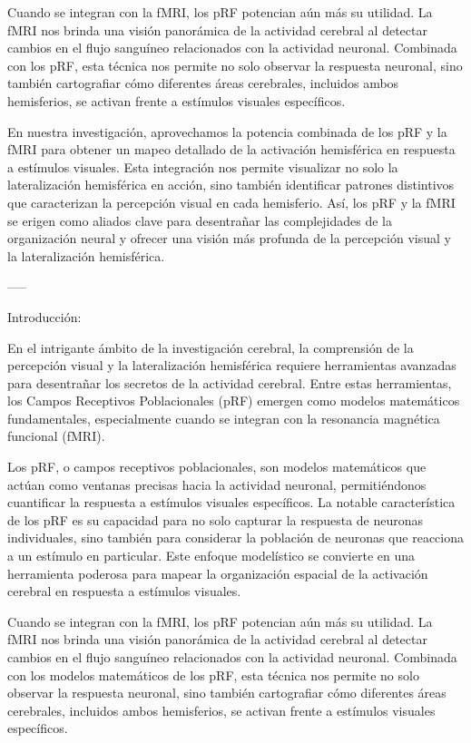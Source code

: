 \documentclass{article}
\begin{document}
	Cuando se integran con la fMRI, los pRF potencian aún más su utilidad. La fMRI nos brinda una visión panorámica de la actividad cerebral al detectar cambios en el flujo sanguíneo relacionados con la actividad neuronal. Combinada con los pRF, esta técnica nos permite no solo observar la respuesta neuronal, sino también cartografiar cómo diferentes áreas cerebrales, incluidos ambos hemisferios, se activan frente a estímulos visuales específicos.
	
	En nuestra investigación, aprovechamos la potencia combinada de los pRF y la fMRI para obtener un mapeo detallado de la activación hemisférica en respuesta a estímulos visuales. Esta integración nos permite visualizar no solo la lateralización hemisférica en acción, sino también identificar patrones distintivos que caracterizan la percepción visual en cada hemisferio. Así, los pRF y la fMRI se erigen como aliados clave para desentrañar las complejidades de la organización neural y ofrecer una visión más profunda de la percepción visual y la lateralización hemisférica.
	
	-----
	
	Introducción:
	
	En el intrigante ámbito de la investigación cerebral, la comprensión de la percepción visual y la lateralización hemisférica requiere herramientas avanzadas para desentrañar los secretos de la actividad cerebral. Entre estas herramientas, los Campos Receptivos Poblacionales (pRF) emergen como modelos matemáticos fundamentales, especialmente cuando se integran con la resonancia magnética funcional (fMRI).
	
	Los pRF, o campos receptivos poblacionales, son modelos matemáticos que actúan como ventanas precisas hacia la actividad neuronal, permitiéndonos cuantificar la respuesta a estímulos visuales específicos. La notable característica de los pRF es su capacidad para no solo capturar la respuesta de neuronas individuales, sino también para considerar la población de neuronas que reacciona a un estímulo en particular. Este enfoque modelístico se convierte en una herramienta poderosa para mapear la organización espacial de la activación cerebral en respuesta a estímulos visuales.
	
	Cuando se integran con la fMRI, los pRF potencian aún más su utilidad. La fMRI nos brinda una visión panorámica de la actividad cerebral al detectar cambios en el flujo sanguíneo relacionados con la actividad neuronal. Combinada con los modelos matemáticos de los pRF, esta técnica nos permite no solo observar la respuesta neuronal, sino también cartografiar cómo diferentes áreas cerebrales, incluidos ambos hemisferios, se activan frente a estímulos visuales específicos.
	
\end{document}
